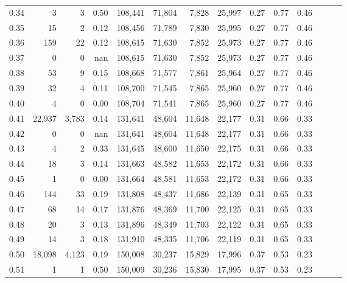 \begin{tabular}{rrrrrrrrrrrrrr}
0.34 &       3 &      3 &  0.50 &  108,441 &   71,804 &   7,828 &  25,997 &  0.27 &  0.77 &      0.46 \\
0.35 &      15 &      2 &  0.12 &  108,456 &   71,789 &   7,830 &  25,995 &  0.27 &  0.77 &      0.46 \\
0.36 &     159 &     22 &  0.12 &  108,615 &   71,630 &   7,852 &  25,973 &  0.27 &  0.77 &      0.46 \\
0.37 &       0 &      0 &   nan &  108,615 &   71,630 &   7,852 &  25,973 &  0.27 &  0.77 &      0.46 \\
0.38 &      53 &      9 &  0.15 &  108,668 &   71,577 &   7,861 &  25,964 &  0.27 &  0.77 &      0.46 \\
0.39 &      32 &      4 &  0.11 &  108,700 &   71,545 &   7,865 &  25,960 &  0.27 &  0.77 &      0.46 \\
0.40 &       4 &      0 &  0.00 &  108,704 &   71,541 &   7,865 &  25,960 &  0.27 &  0.77 &      0.46 \\
0.41 &  22,937 &  3,783 &  0.14 &  131,641 &   48,604 &  11,648 &  22,177 &  0.31 &  0.66 &      0.33 \\
0.42 &       0 &      0 &   nan &  131,641 &   48,604 &  11,648 &  22,177 &  0.31 &  0.66 &      0.33 \\
0.43 &       4 &      2 &  0.33 &  131,645 &   48,600 &  11,650 &  22,175 &  0.31 &  0.66 &      0.33 \\
0.44 &      18 &      3 &  0.14 &  131,663 &   48,582 &  11,653 &  22,172 &  0.31 &  0.66 &      0.33 \\
0.45 &       1 &      0 &  0.00 &  131,664 &   48,581 &  11,653 &  22,172 &  0.31 &  0.66 &      0.33 \\
0.46 &     144 &     33 &  0.19 &  131,808 &   48,437 &  11,686 &  22,139 &  0.31 &  0.65 &      0.33 \\
0.47 &      68 &     14 &  0.17 &  131,876 &   48,369 &  11,700 &  22,125 &  0.31 &  0.65 &      0.33 \\
0.48 &      20 &      3 &  0.13 &  131,896 &   48,349 &  11,703 &  22,122 &  0.31 &  0.65 &      0.33 \\
0.49 &      14 &      3 &  0.18 &  131,910 &   48,335 &  11,706 &  22,119 &  0.31 &  0.65 &      0.33 \\
0.50 &  18,098 &  4,123 &  0.19 &  150,008 &   30,237 &  15,829 &  17,996 &  0.37 &  0.53 &      0.23 \\
0.51 &       1 &      1 &  0.50 &  150,009 &   30,236 &  15,830 &  17,995 &  0.37 &  0.53 &      0.23 \\

\end{tabular}
